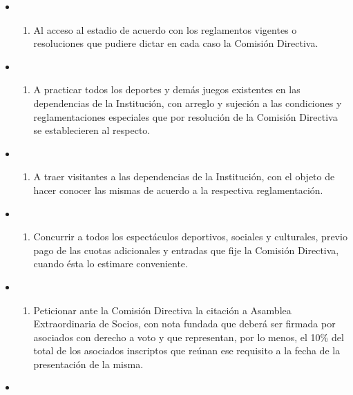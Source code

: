 \documentclass[openany]{book}
\providecommand{\tightlist}{%
  \setlength{\itemsep}{0pt}\setlength{\parskip}{0pt}}
\begin{document}
\begin{itemize}
\begin{itemize}
\begin{enumerate}
    \end{enumerate}
  \item
    \begin{enumerate}
    \def\labelenumi{\alph{enumi})}
    \setcounter{enumi}{5}
    \tightlist
    \item
      Al acceso al estadio de acuerdo con los reglamentos vigentes o resoluciones que pudiere dictar en cada caso la Comisión Directiva.
    \end{enumerate}
  \item
    \begin{enumerate}
    \def\labelenumi{\alph{enumi})}
    \setcounter{enumi}{6}
    \tightlist
    \item
      A practicar todos los deportes y demás juegos existentes en las dependencias de la Institución, con arreglo y sujeción a las condiciones y reglamentaciones especiales que por resolución de la Comisión Directiva se establecieren al respecto.
    \end{enumerate}
  \item
    \begin{enumerate}
    \def\labelenumi{\alph{enumi})}
    \setcounter{enumi}{7}
    \tightlist
    \item
      A traer visitantes a las dependencias de la Institución, con el objeto de hacer conocer las mismas de acuerdo a la respectiva reglamentación.
    \end{enumerate}
  \item
    \begin{enumerate}
    \def\labelenumi{\roman{enumi})}
    \tightlist
    \item
      Concurrir a todos los espectáculos deportivos, sociales y culturales, previo pago de las cuotas adicionales y entradas que fije la Comisión Directiva, cuando ésta lo estimare conveniente.
    \end{enumerate}
  \item
    \begin{enumerate}
    \def\labelenumi{\alph{enumi})}
    \setcounter{enumi}{9}
    \tightlist
    \item
      Peticionar ante la Comisión Directiva la citación a Asamblea Extraordinaria de Socios, con nota fundada que deberá ser firmada por asociados con derecho a voto y que representan, por lo menos, el 10\% del total de los asociados inscriptos que reúnan ese requisito a la fecha de la presentación de la misma.
    \end{enumerate}
  \item

\end{itemize}
\end{itemize}
\end{document}
